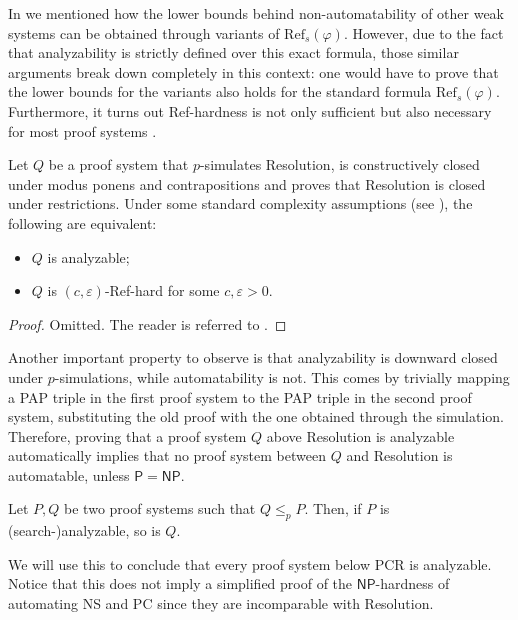 In  we mentioned how the lower bounds behind non-automatability of other weak systems can be obtained through variants of $\mathrm{Ref}_s(\varphi)$. However, due to the fact that analyzability is strictly defined over this exact formula, those similar arguments break down completely in this context: one would have to prove that the lower bounds for the variants also holds for the standard formula $\mathrm{Ref}_s(\varphi)$. Furthermore, it turns out Ref-hardness is not only sufficient but also necessary for most proof systems \cite{pap}.

\begin{theorem}
    Let $Q$ be a proof system that $p$-simulates Resolution, is constructively closed under modus ponens and contrapositions and proves that Resolution is closed under restrictions. Under some standard complexity assumptions (see \cite{pap}), the following are equivalent:
    \begin{itemize}[nosep]
        \item $Q$ is analyzable;
        \item $Q$ is $(c,\varepsilon)$-Ref-hard for some $c,\varepsilon > 0$.
    \end{itemize}
\end{theorem}

\begin{proof}
    Omitted. The reader is referred to \Cite{pap}.
\end{proof}

Another important property to observe is that analyzability is downward closed under $p$-simulations, while automatability is not. This comes by trivially mapping a PAP triple in the first proof system to the PAP triple in the second proof system, substituting the old proof with the one obtained through the simulation. Therefore, proving that a proof system $Q$ above Resolution is analyzable automatically implies that no proof system between $Q$ and Resolution is automatable, unless $\mathsf{P} = \mathsf{NP}$.

\begin{proposition}
    Let $P,Q$ be two proof systems such that $Q \leq_p P$. Then, if $P$ is (search-)analyzable, so is $Q$.
\end{proposition}

We will use this to conclude that every proof system below PCR is analyzable. Notice that this does not imply a simplified proof of the $\mathsf{NP}$-hardness of automating NS and PC since they are incomparable with Resolution.

